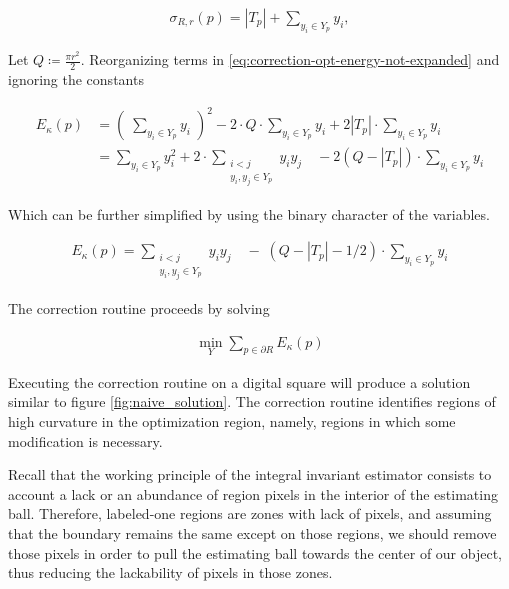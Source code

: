 \documentclass[runningheads]{llncs}
\begin{document}
	\begin{align*}
		\sigma_{R,r}(p) = |T_{p}| + \sum_{y_i \in Y_p}{y_i},
	\end{align*}
	
	Let $Q \coloneqq \frac{\pi r^2}{2}$. Reorganizing terms in \eqref{eq:correction-opt-energy-not-expanded} and ignoring the constants 
	
	\begin{align*}
		E_{\kappa}(p) &= \left( \; \sum_{y_i \in Y_{p}}{y_i} \; \right) ^2 -2 \cdot Q\cdot \sum_{y_i \in Y_{p}}{y_i} + 2 |T_p| \cdot \sum_{ y_i \in Y_{p} }{y_i} \\[1em]
		&= \sum_{y_i \in Y_{p}}{y_i^2} + 2 \cdot \sum_{ \substack{ i<j \\ y_i,y_j \in Y_{p}  } }{y_iy_j} \quad - 2 (Q-|T_p|)\cdot \sum_{y_i \in Y_{p}}{y_i}
	\end{align*}
	
	Which can be further simplified by using the binary character of the variables.
	
	\begin{align*}
		E_{\kappa}(p) =\sum_{ \substack{ i<j \\ y_i,y_j \in Y_{p}  } }{y_iy_j} \quad  - \;(Q-|T_p|-1/2)\cdot \sum_{y_i \in Y_{p}}{y_i}
	\end{align*}	
	
	The correction routine proceeds by solving
	
	\begin{align}
		\min_{Y} \sum_{p \in \partial R}E_{\kappa}(p)
		\label{eq:optimization_problem_no_conn}
	\end{align}
	
	Executing the correction routine on a digital square will produce a solution similar to figure \ref{fig:naive_solution}. The correction routine identifies regions of high curvature in the optimization region, namely, regions in which some modification is necessary. 
	
	
	Recall that the working principle of the integral invariant estimator consists to account a lack or an abundance of region pixels in the interior of the estimating ball. Therefore, labeled-one regions are zones with lack of pixels, and assuming that the boundary remains the same except on those regions, we should remove those pixels in order to pull the estimating ball towards the center of our object, thus reducing the lackability of pixels in those zones.
\end{document}
